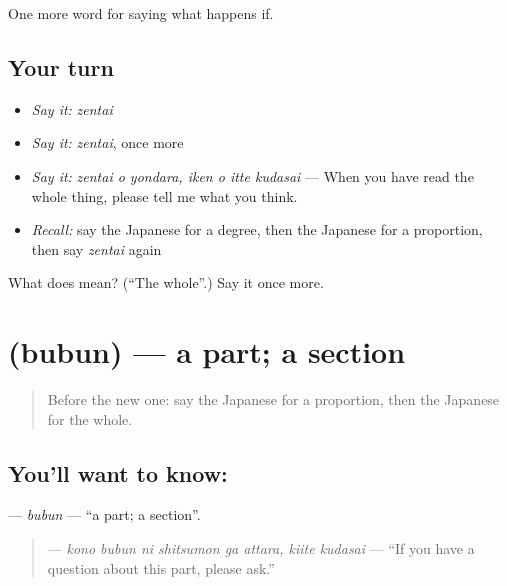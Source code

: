 \begin{grammarlens}[title={What you've built}]
One more word for saying what happens if.
\end{grammarlens}

\subsection*{Your turn}
\begin{itemize}
\raggedright
  \item \emph{Say it:} \emph{zentai}
  \item \emph{Say it:} \emph{zentai}, once more
  \item \emph{Say it:} \emph{zentai o yondara, iken o itte kudasai} — When you have read the whole thing, please tell me what you think.
  \item \emph{Recall:} say the Japanese for a degree, then the Japanese for a proportion, then say \emph{zentai} again
\end{itemize}

\begin{tcolorbox}[breakable,colback=teal!4,colframe=teal!35!black,title={Before you move on}]
What does  mean? (\textquotedblleft{}The whole\textquotedblright{}.) Say it once more.
\end{tcolorbox}
\section[\texorpdfstring{\ja{ぶぶん} (bubun)}{ぶぶん (bubun)}]{ (bubun) — a part; a section}

\label{lesson:JA-C368-bubun}



\begin{quote}
Before the new one: say the Japanese for a proportion, then the Japanese for the whole.
\end{quote}

\subsection*{You'll want to know: }
\textbf{} — \emph{bubun} — \textquotedblleft{}a part; a section\textquotedblright{}.

\begin{quote}
\textbf{    } — \emph{kono bubun ni shitsumon ga attara, kiite kudasai} — \textquotedblleft{}If you have a question about this part, please ask.\textquotedblright{}
\end{quote}

